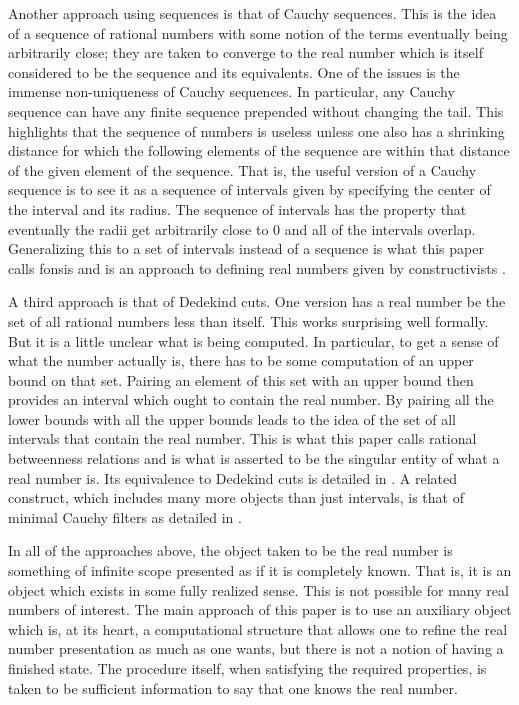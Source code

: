 \documentclass[12pt]{article}
\begin{document}
Another approach using sequences is that of Cauchy sequences. This is the idea of a sequence of rational numbers  with some notion of the terms eventually being arbitrarily close; they are taken to converge to the real number which is itself considered to be the sequence and its equivalents. One of the issues is the immense non-uniqueness of Cauchy sequences. In particular, any Cauchy sequence can have any finite sequence prepended without changing the tail. This highlights that the sequence of numbers is useless unless one also has a shrinking distance  for which the following elements of the sequence are within that distance of the given element of the sequence. That is, the useful version of a Cauchy sequence is to see it as a sequence of intervals given by specifying the center of the interval and its radius. The sequence of intervals has the property that eventually the radii get arbitrarily close to 0 and all of the intervals overlap. Generalizing this to a set of intervals instead of a sequence is what this paper calls fonsis and is an approach to defining real numbers given by constructivists \cite{bridger}.

A third approach is that of Dedekind cuts. One version has a real number be the set of all rational numbers less than itself. This works surprising well formally. But it is a little unclear what is being computed. In particular, to get a sense of what the number actually is, there has to be some computation of an upper bound on that set. Pairing an element of this set with an upper bound then provides an interval which ought to contain the real number. By pairing all the lower bounds with all the upper bounds leads to the idea of the set of all intervals that contain the real number. This is what this paper calls rational betweenness relations and is what is asserted to be the singular entity of what a real number is. Its equivalence to Dedekind cuts is detailed in \cite{taylor24dedekind}. A related construct, which includes many more objects than just intervals, is that of minimal Cauchy filters as detailed in \cite{ittay-2015}.

In all of the approaches above, the object taken to be the real number is something of infinite scope presented as if it is completely known. That is, it is an object which exists in some fully realized sense. This is not possible for many real numbers of interest. The main approach of this paper is to use an auxiliary object which is, at its heart, a computational structure that allows one to refine the real number presentation as much as one wants, but there is not a notion of having a finished state. The procedure itself, when satisfying the required properties, is taken to be sufficient information to say that one knows the real number. 
\end{document}
